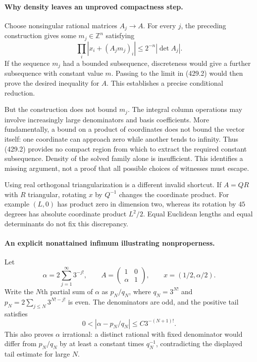 \documentclass[11pt]{article}
\begin{document}
\paragraph{Why density leaves an unproved compactness step.}
Choose nonsingular rational matrices $A_j\to A$. For every $j$, the preceding construction gives some $m_j\in\mathbb Z^n$ satisfying
\[
 \prod_i|x_i+(A_jm_j)_i|\le2^{-n}|\det A_j|. \tag{429.2}
\]
If the sequence $m_j$ had a bounded subsequence, discreteness would give a further subsequence with constant value $m$. Passing to the limit in (429.2) would then prove the desired inequality for $A$. This establishes a precise conditional reduction.

But the construction does not bound $m_j$. The integral column operations may involve increasingly large denominators and basis coefficients. More fundamentally, a bound on a product of coordinates does not bound the vector itself: one coordinate can approach zero while another tends to infinity. Thus (429.2) provides no compact region from which to extract the required constant subsequence. Density of the solved family alone is insufficient. This identifies a missing argument, not a proof that all possible choices of witnesses must escape.

Using real orthogonal triangularization is a different invalid shortcut. If $A=QR$ with $R$ triangular, rotating $x$ by $Q^{-1}$ changes the coordinate product. For example $(L,0)$ has product zero in dimension two, whereas its rotation by $45$ degrees has absolute coordinate product $L^2/2$. Equal Euclidean lengths and equal determinants do not fix this discrepancy.

\paragraph{An explicit nonattained infimum illustrating nonproperness.}
Let
\[
 \alpha=2\sum_{j=1}^{\infty}3^{-j!},\qquad
 A=\begin{pmatrix}1&0\\\alpha&1\end{pmatrix},\qquad
 x=(1/2,\alpha/2).
\]
Write the $N$th partial sum of $\alpha$ as $p_N/q_N$, where $q_N=3^{N!}$ and $p_N=2\sum_{j\le N}3^{N!-j!}$ is even. The denominators are odd, and the positive tail satisfies
\[
 0<|\alpha-p_N/q_N|\le C3^{-(N+1)!}.
\]
This also proves $\alpha$ irrational: a distinct rational with fixed denominator would differ from $p_N/q_N$ by at least a constant times $q_N^{-1}$, contradicting the displayed tail estimate for large $N$.
\end{document}
